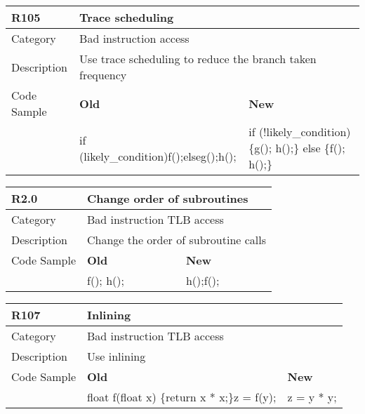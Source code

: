 \begin{tabular}{|p{0.9in}|p{2.0in}|p{2.0in}|} \hline
\textbf{R105}       & \multicolumn{2}{|p{4.0in}|}{\textbf{Trace scheduling}} \\ \hline
Category            & \multicolumn{2}{|p{4.0in}|}{Bad instruction access} \\ \hline
Description         & \multicolumn{2}{|p{4.0in}|}{Use trace scheduling to reduce the branch taken frequency} \\ \hline
Code Sample         & \textbf{Old} & \textbf{New} \\ \hline
                    & if (likely\_condition)\newline   f();\newline else\newline   g();\newline h();
                    & if (!likely\_condition) \{\newline   g(); h();\newline \} else \{\newline   f(); h();\newline \} \\ \hline
\end{tabular}

\begin{tabular}{|p{0.9in}|p{2.0in}|p{2.0in}|} \hline
\textbf{R2.0}       & \multicolumn{2}{|p{4.0in}|}{\textbf{Change order of subroutines}} \\ \hline
Category            & \multicolumn{2}{|p{4.0in}|}{Bad instruction TLB access} \\ \hline
Description         & \multicolumn{2}{|p{4.0in}|}{Change the order of subroutine calls} \\ \hline
Code Sample         & \textbf{Old} & \textbf{New} \\ \hline
                    & f(); \newline h();
                    & h();\newline f(); \\ \hline
\end{tabular}

\begin{tabular}{|p{0.9in}|p{2.0in}|p{2.0in}|} \hline
\textbf{R107}       & \multicolumn{2}{|p{4.0in}|}{\textbf{Inlining}} \\ \hline
Category            & \multicolumn{2}{|p{4.0in}|}{Bad instruction TLB access} \\ \hline
Description         & \multicolumn{2}{|p{4.0in}|}{Use inlining} \\ \hline
Code Sample         & \textbf{Old} & \textbf{New} \\ \hline
                    & float f(float x) \{\newline   return x * x;\newline \}\newline z = f(y);
                    & z = y * y; \\ \hline
\end{tabular}


